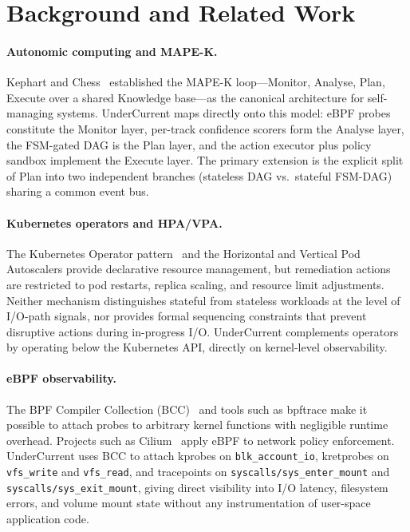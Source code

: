 \documentclass[runningheads]{llncs}
\begin{document}
\section{Background and Related Work}
\label{sec:background}

\paragraph{Autonomic computing and MAPE-K.}
Kephart and Chess~\cite{mapek} established the MAPE-K loop---Monitor,
Analyse, Plan, Execute over a shared Knowledge base---as the canonical
architecture for self-managing systems. UnderCurrent maps directly onto
this model: eBPF probes constitute the Monitor layer, per-track
confidence scorers form the Analyse layer, the FSM-gated DAG is the
Plan layer, and the action executor plus policy sandbox implement the
Execute layer. The primary extension is the explicit split of Plan into
two independent branches (stateless DAG vs.\ stateful FSM-DAG) sharing
a common event bus.

\paragraph{Kubernetes operators and HPA/VPA.}
The Kubernetes Operator pattern~\cite{burnsk8s} and the Horizontal and
Vertical Pod Autoscalers provide declarative resource management, but
remediation actions are restricted to pod restarts, replica scaling, and
resource limit adjustments. Neither mechanism distinguishes stateful
from stateless workloads at the level of I/O-path signals, nor provides
formal sequencing constraints that prevent disruptive actions during
in-progress I/O. UnderCurrent complements operators by operating below
the Kubernetes API, directly on kernel-level observability.

\paragraph{eBPF observability.}
The BPF Compiler Collection (BCC)~\cite{bcc} and tools such as
bpftrace make it possible to attach probes to arbitrary kernel
functions with negligible runtime overhead. Projects such as
Cilium~\cite{cilium} apply eBPF to network policy enforcement.
UnderCurrent uses BCC to attach kprobes on \texttt{blk\_account\_io},
kretprobes on \texttt{vfs\_write} and \texttt{vfs\_read}, and
tracepoints on \texttt{syscalls/sys\_enter\_mount} and
\texttt{syscalls/sys\_exit\_mount}, giving direct visibility into I/O
latency, filesystem errors, and volume mount state without any
instrumentation of user-space application code.
\end{document}
